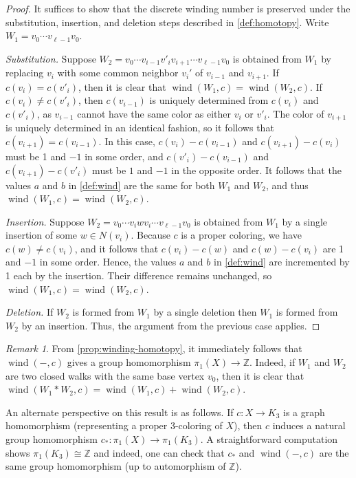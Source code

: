\documentclass[12pt,letterpaper]{amsart}
\theoremstyle{definition}
\theoremstyle{remark}
\newtheorem{remark}[theorem]{Remark}
\newcommand{\Z}{{\mathbb Z}}
\DeclareMathOperator{\wind}{wind}
\begin{document}
\begin{proof}
It suffices to show that the discrete winding number is preserved under the substitution, insertion, and deletion steps described in \cref{def:homotopy}. Write $W_1=v_0\cdots v_{\ell-1}v_0$.

\textit{Substitution.} Suppose $W_2=v_0\cdots v_{i-1}v'_iv_{i+1}\cdots v_{\ell-1}v_0$ is obtained from $W_1$ by replacing $v_i$ with some common neighbor $v_i'$ of $v_{i-1}$ and $v_{i+1}$. If $c(v_i)=c(v'_i)$, then it is clear that $\wind(W_1,c)=\wind(W_2,c)$. If $c(v_i)\neq c(v'_i)$, then $c(v_{i-1})$ is uniquely determined from $c(v_i)$ and $c(v'_i)$, as $v_{i-1}$ cannot have the same color as either $v_i$ or $v'_i$. The color of $v_{i+1}$ is uniquely determined in an identical fashion, so it follows that $c(v_{i+1})=c(v_{i-1})$. In this case, $c(v_i)-c(v_{i-1})$ and $c(v_{i+1})- c(v_i)$ must be 1 and $-1$ in some order, and $c(v'_i)-c(v_{i-1})$ and $c(v_{i+1})-c(v'_i)$ must be $1$ and $-1$ in the opposite order. It follows that the values $a$ and $b$ in \cref{def:wind} are the same for both $W_1$ and $W_2$, and thus $\wind(W_1,c)=\wind(W_2,c)$.

\textit{Insertion.} Suppose $W_2=v_0\cdots v_iwv_i\cdots v_{\ell-1}v_0$ is obtained from $W_1$ by a single insertion of some $w\in N(v_i)$. Because $c$ is a proper coloring, we have $c(w)\neq c(v_i)$, and it follows that $c(v_i)-c(w)$ and $c(w)-c(v_i)$ are 1 and $-1$ in some order. Hence, the values $a$ and $b$ in \cref{def:wind} are incremented by 1 each by the insertion. Their difference remains unchanged, so $\wind(W_1,c)=\wind(W_2,c)$.

\textit{Deletion.} If $W_2$ is formed from $W_1$ by a single deletion then $W_1$ is formed from $W_2$ by an insertion. Thus, the argument from the previous case applies.
\end{proof}

\begin{remark}\label{remark:pushforward}
From \cref{prop:winding-homotopy}, it immediately follows that $\wind(-,c)$ gives a group homomorphism $\pi_1(X)\to\Z$. Indeed, if $W_1$ and $W_2$ are two closed walks with the same base vertex $v_0$, then it is clear that $\wind(W_1*W_2,c)=\wind(W_1,c)+\wind(W_2,c)$.

An alternate perspective on this result is as follows. If $c:X\to K_3$ is a graph homomorphism (representing a proper 3-coloring of $X$), then $c$ induces a natural group homomorphism $c_*:\pi_1(X)\to\pi_1(K_3)$. A straightforward computation shows $\pi_1(K_3)\cong\Z$ and indeed, one can check that $c_*$ and $\wind(-,c)$ are the same group homomorphism (up to automorphism of $\Z$).
\end{remark}
\end{document}
